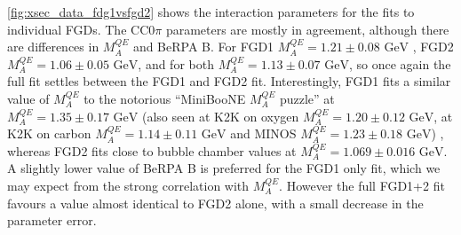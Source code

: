 \autoref{fig:xsec_data_fdg1vsfgd2} shows the interaction parameters for the fits to individual FGDs. The CC0$\pi$ parameters are mostly in agreement, although there are differences in $M_A^{QE}$ and BeRPA B. For FGD1 $M_A^{QE} = 1.21\pm0.08\text{ GeV}$ , FGD2 $M_A^{QE} = 1.06\pm0.05\text{ GeV}$, and for both $M_A^{QE} = 1.13\pm0.07\text{ GeV}$, so once again the full fit settles between the FGD1 and FGD2 fit. Interestingly, FGD1 fits a similar value of $M_A^{QE}$ to the notorious ``MiniBooNE $M_A^{QE}$ puzzle'' at $M_A^{QE}=1.35\pm0.17\text{ GeV}$ \cite{miniboone_nu_ccqe} (also seen at K2K on oxygen $M_A^{QE}=1.20\pm0.12\text{ GeV}$\cite{k2k_ccqe_oxygen}, at K2K on carbon $M_A^{QE}=1.14\pm0.11\text{ GeV}$\cite{k2k_ccqe_carbon} and MINOS $M_A^{QE}=1.23\pm0.18\text{ GeV}$\cite{minos_ccqe_iron}) , whereas FGD2 fits close to bubble chamber values at $M_A^{QE}=1.069\pm 0.016\text{ GeV}$\cite{maqe_fit}. A slightly lower value of BeRPA B is preferred for the FGD1 only fit, which we may expect from the strong correlation with $M_A^{QE}$. However the full FGD1+2 fit favours a value almost identical to FGD2 alone, with a small decrease in the parameter error.

